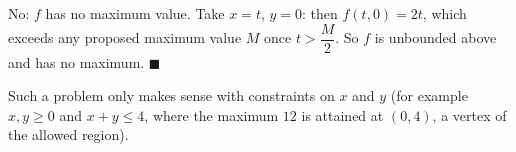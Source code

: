 No: $f$ has no maximum value. Take $x=t$, $y=0$: then $f(t,0)=2t$, which exceeds any proposed maximum value $M$ once $t>\dfrac {M}{2}$. So $f$ is unbounded above and has no maximum. $\blacksquare$

Such a problem only makes sense with constraints on $x$ and $y$ (for example $x,y\ge0$ and $x+y\le4$, where the maximum $12$ is attained at $(0,4)$, a vertex of the allowed region).
